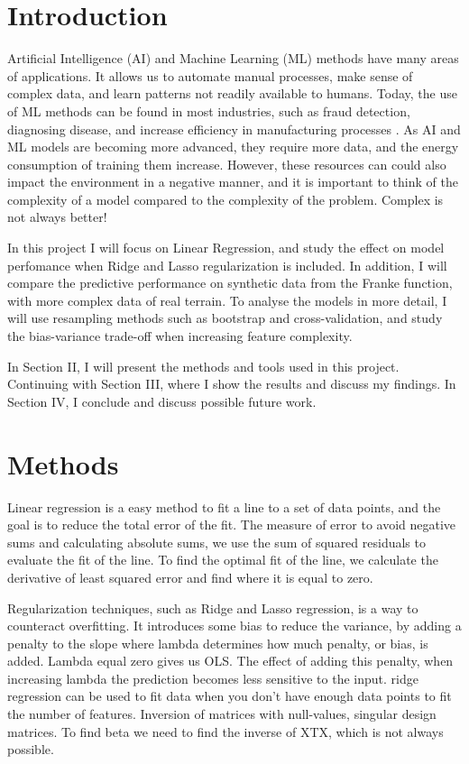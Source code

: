 \section{Introduction}\label{sec:introduction}
Artificial Intelligence (AI) and Machine Learning (ML) methods have many areas of applications. It allows us to automate manual processes, make sense of complex data, and learn patterns not readily available to humans. Today, the use of ML methods can be found in most industries, such as fraud detection, diagnosing disease, and increase efficiency in manufacturing processes \cite{forbes:2023:machine_learning}. As AI and ML models are becoming more advanced, they require more data, and the energy consumption of training them increase. However, these resources can could also impact the environment in a negative manner, and it is important to think of the complexity of a model compared to the complexity of the problem. Complex is not always better! 

In this project I will focus on Linear Regression, and study the effect on model perfomance when Ridge and Lasso regularization is included. In addition, I will compare the predictive performance on synthetic data from the Franke function, with more complex data of real terrain. To analyse the models in more detail, I will use resampling methods such as bootstrap and cross-validation, and study the bias-variance trade-off when increasing feature complexity.

In Section II, I will present the methods and tools used in this project. Continuing with Section III, where I show the results and discuss my findings. In Section IV, I conclude and discuss possible future work.


\section{Methods}\label{sec:methods}
Linear regression is a easy method to fit a line to a set of data points, and the goal is to reduce the total error of the fit. The measure of error to avoid negative sums and calculating absolute sums, we use the sum of squared residuals to evaluate the fit of the line. To find the optimal fit of the line, we calculate the derivative of least squared error and find where it is equal to zero.

Regularization techniques, such as Ridge and Lasso regression, is a way to counteract overfitting. It introduces some bias to reduce the variance, by adding a penalty to the slope where lambda determines how much penalty, or bias, is added. Lambda equal zero gives us OLS. The effect of adding this penalty, when increasing lambda the prediction becomes less sensitive to the input. ridge regression can be used to fit data when you don't have enough data points to fit the number of features. Inversion of matrices with null-values, singular design matrices. To find beta we need to find the inverse of XTX, which is not always possible.

